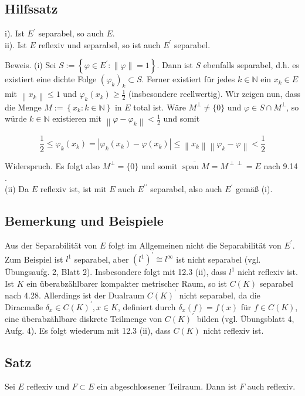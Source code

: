 \documentclass[10pt, letterpaper]{article}
\begin{document}
\subsection*{Hilfssatz}
i). Ist $E^{\prime}$ separabel, so auch $E$.\\
ii). Ist $E$ reflexiv und separabel, so ist auch $E^{\prime}$ separabel.

Beweis. (i) Sei $S:=\left\{\varphi \in E^{\prime}:\|\varphi\|=1\right\}$. Dann ist $S$ ebenfalls separabel, d.h. es existiert eine dichte Folge $\left(\varphi_{k}\right)_{k} \subset S$. Ferner existiert für jedes $k \in \mathbb{N}$ ein $x_{k} \in E$ mit $\left\|x_{k}\right\| \leq 1$ und $\varphi_{k}\left(x_{k}\right) \geq \frac{1}{2}$ (insbesondere reellwertig). Wir zeigen nun, dass die Menge $M:=\left\{x_{k}: k \in \mathbb{N}\right\}$ in $E$ total ist. Wäre $M^{\perp} \neq\{0\}$ und $\varphi \in S \cap M^{\perp}$, so würde $k \in \mathbb{N}$ existieren mit $\left\|\varphi-\varphi_{k}\right\|<\frac{1}{2}$ und somit

$$
\frac{1}{2} \leq \varphi_{k}\left(x_{k}\right)=\left|\varphi_{k}\left(x_{k}\right)-\varphi\left(x_{k}\right)\right| \leq\left\|x_{k}\right\|\left\|\varphi_{k}-\varphi\right\|<\frac{1}{2}
$$

Widerspruch. Es folgt also $M^{\perp}=\{0\}$ und somit $\overline{\operatorname{span} M}=M^{\perp \perp}=E$ nach 9.14 .\\
(ii) Da $E$ reflexiv ist, ist mit $E$ auch $E^{\prime \prime}$ separabel, also auch $E^{\prime}$ gemäß (i).

\subsection*{Bemerkung und Beispiele}
Aus der Separabilität von $E$ folgt im Allgemeinen nicht die Separabilität von $E^{\prime}$. Zum Beispiel ist $l^{1}$ separabel, aber $\left(l^{1}\right)^{\prime} \cong l^{\infty}$ ist nicht separabel (vgl. Übungsaufg. 2, Blatt 2). Insbesondere folgt mit 12.3 (ii), dass $l^{1}$ nicht reflexiv ist. Ist $K$ ein überabzählbarer kompakter metrischer Raum, so ist $C(K)$ separabel nach 4.28. Allerdings ist der Dualraum $C(K)^{\prime}$ nicht separabel, da die Diracmaße $\delta_{x} \in C(K)^{\prime}, x \in K$, definiert durch $\delta_{x}(f)=f(x)$ für $f \in C(K)$, eine überabzählbare diskrete Teilmenge von $C(K)^{\prime}$ bilden (vgl. Übungsblatt 4, Aufg. 4). Es folgt wiederum mit 12.3 (ii), dass $C(K)$ nicht reflexiv ist.

\subsection*{Satz}
Sei $E$ reflexiv und $F \subset E$ ein abgeschlossener Teilraum. Dann ist $F$ auch reflexiv.
\end{document}
